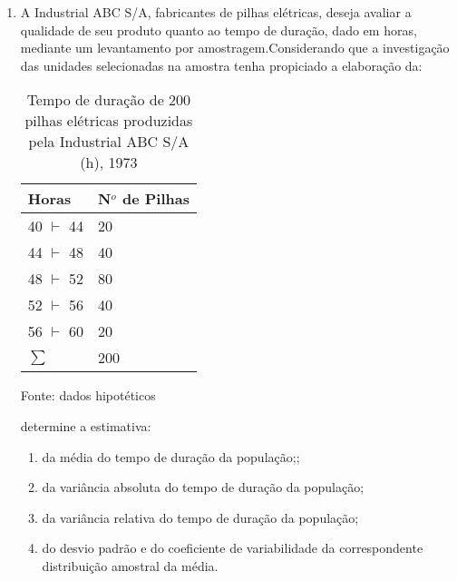 \begin{enumerate}[resume]
\item A Industrial ABC S/A, fabricantes de pilhas elétricas, deseja avaliar a qualidade de seu produto quanto ao tempo de duração, dado em horas, mediante um levantamento por amostragem.Considerando que a investigação das unidades selecionadas na amostra tenha propiciado a elaboração da:
	\begin{table}[!htb]
	\centering
	\caption{Tempo de duração de 200 pilhas elétricas produzidas pela Industrial ABC S/A (h), 1973}
	\vspace{0.5cm}
	\begin{tabular}{ll}
	Horas & N$^o$ de Pilhas \\
	\hline 
	40 $\vdash$ 44 & 20 \\
	44 $\vdash$ 48 & 40 \\
	48 $\vdash$ 52 & 80 \\
	52 $\vdash$ 56 & 40 \\
	56 $\vdash$ 60 & 20 \\
	\hline
	$\sum$ & 200
	\end{tabular}
	 \newline \newline Fonte: dados hipotéticos
	\end{table}
	\newline determine a estimativa:
	\begin{enumerate}
	\item da média do tempo de duração da população;;
	\item da variância absoluta do tempo de duração da população;
	\item da variância relativa do tempo de duração da população;
	\item do desvio padrão e do coeficiente de variabilidade da correspondente distribuição amostral da média.
	\end{enumerate}		


\end{enumerate}
